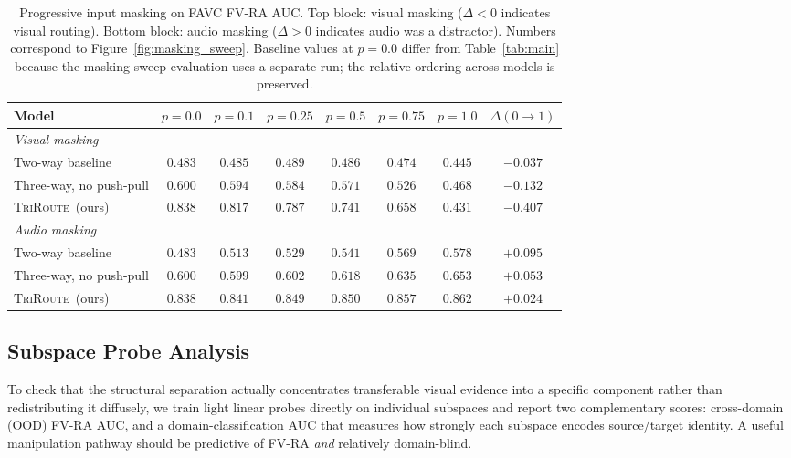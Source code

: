 \documentclass{article}
\newcommand{\method}{\textsc{TriRoute}}
\begin{document}
\begin{table}[t]
    \centering
    \caption{Progressive input masking on FAVC FV-RA AUC. Top block: visual masking ($\Delta < 0$ indicates visual routing). Bottom block: audio masking ($\Delta > 0$ indicates audio was a distractor). Numbers correspond to Figure~\ref{fig:masking_sweep}. Baseline values at $p{=}0.0$ differ from Table~\ref{tab:main} because the masking-sweep evaluation uses a separate run; the relative ordering across models is preserved.}
    \label{tab:masking_sweep}
    \small
    \begin{tabular}{lccccccc}
        \toprule
        Model & $p{=}0.0$ & $p{=}0.1$ & $p{=}0.25$ & $p{=}0.5$ & $p{=}0.75$ & $p{=}1.0$ & $\Delta(0{\rightarrow}1)$ \\
        \midrule
        \multicolumn{8}{l}{\emph{Visual masking}} \\
        Two-way baseline        & $0.483$ & $0.485$ & $0.489$ & $0.486$ & $0.474$ & $0.445$ & $-0.037$ \\
        Three-way, no push-pull & $0.600$ & $0.594$ & $0.584$ & $0.571$ & $0.526$ & $0.468$ & $-0.132$ \\
        \method\ (ours)         & $0.838$ & $0.817$ & $0.787$ & $0.741$ & $0.658$ & $0.431$ & $\mathbf{-0.407}$ \\
        \midrule
        \multicolumn{8}{l}{\emph{Audio masking}} \\
        Two-way baseline        & $0.483$ & $0.513$ & $0.529$ & $0.541$ & $0.569$ & $0.578$ & $\mathbf{+0.095}$ \\
        Three-way, no push-pull & $0.600$ & $0.599$ & $0.602$ & $0.618$ & $0.635$ & $0.653$ & $+0.053$ \\
        \method\ (ours)         & $0.838$ & $0.841$ & $0.849$ & $0.850$ & $0.857$ & $0.862$ & $+0.024$ \\
        \bottomrule
    \end{tabular}
\end{table}

\subsection{Subspace Probe Analysis}

To check that the structural separation actually concentrates transferable visual evidence into a specific component rather than redistributing it diffusely, we train light linear probes directly on individual subspaces and report two complementary scores: cross-domain (OOD) FV-RA AUC, and a domain-classification AUC that measures how strongly each subspace encodes source/target identity. A useful manipulation pathway should be predictive of FV-RA \emph{and} relatively domain-blind.
\end{document}
